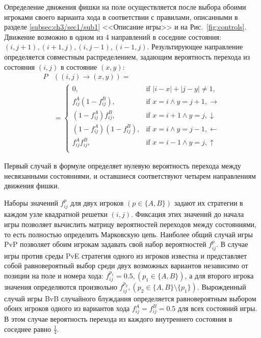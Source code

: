 Определение движения фишки на поле осуществляется после выбора обоими игроками своего варианта хода в соответствии с правилами, описанными в разделе \cref{subsec:ch3/sec1/sub1} <<Описание игры>> и на Рис.~\cref{fig:controls}. Движение возможно в одном из 4 направлений в соседние состояния: $(i, j + 1), (i + 1, j), (i, j - 1), (i - 1, j)$. Результирующее направление определяется совместным распределением, задающим вероятность перехода из состояния $(i, j)$ в состояние $(x, y)$:
\begin{equation}
    \begin{aligned}
    P& \left( (i, j) \rightarrow (x, y) \right) = \\
    &=\begin{cases}
        0, &\mbox{if } |i-x|+|j-y| \neq 1,\\ 
        f_{ij}^A \left(1-f_{ij}^B\right), &\mbox{if } x=i \land y=j+1, \boldsymbol{\rightarrow}\\
        \left(1-f_{ij}^A\right) f_{ij}^B, &\mbox{if } x=i+1 \land y=j, \boldsymbol{\downarrow}\\
        \left(1-f_{ij}^A\right) \left(1-f_{ij}^B\right), &\mbox{if } x=i \land y=j-1, \boldsymbol{\leftarrow}\\
        f_{ij}^A f_{ij}^B, &\mbox{if } x=i-1 \land y=j, \boldsymbol{\uparrow}\\
    \end{cases}
    \label{eq:transition}
    \end{aligned}
\end{equation}

Первый случай в формуле определяет нулевую вероятность перехода между несвязанными состояниями, и оставшиеся соответствуют четырем направлениям движения фишки.

Наборы значений $f_{ij}^p$ для двух игроков $(p \in \{A, B\})$ задают их стратегии в каждом узле квадратной решетки $(i, j)$. Фиксация этих значений до начала игры позволяет вычислить матрицу вероятностей переходов между состояниями, то есть полностью определить Марковскую цепь. Наиболее общий случай игры PvP позволяет обоим игрокам задавать свой набор вероятностей $f_{ij}^p$. В случае игры против среды PvE стратегия одного из игроков известна и представляет собой равновероятный выбор среди двух возможных вариантов независимо от позиции на поле и номера хода: $f_{ij}^{p_1} = 0.5, (p_1 \in \{A, B\})$, а для второго игрока значения определяются произвольно $f_{ij}^{p_2}, (p_2 \in \{A, B\} \setminus \{p_1\})$. Вырожденный случай игры BvB случайного блуждания определяется равновероятным выбором обоих игроков одного из вариантов хода $f_{ij}^{A} = f_{ij}^{B} = 0.5$ для всех состояний игры. В этом случае вероятность перехода из каждого внутреннего состояния в соседнее равно $\frac{1}{4}$.

